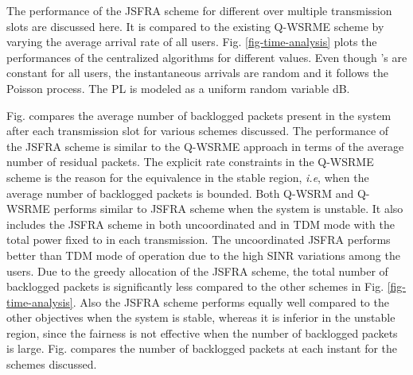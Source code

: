 The performance of the \ac{JSFRA} scheme for different  over multiple transmission slots are discussed here. It is compared to the existing \ac{Q-WSRME} scheme by varying the average arrival rate  of all users. Fig. \ref{fig-time-analysis} plots the performances of the centralized algorithms for different  values. Even though 's are constant for all users, the instantaneous arrivals are random and it follows the Poisson process. The \ac{PL} is modeled as a uniform random variable \me{[0,-6]} dB.

Fig.  compares the average number of backlogged packets present in the system after each transmission slot for various schemes discussed. The performance of the  \ac{JSFRA} scheme is similar to the \ac{Q-WSRME} approach in terms of the average number of residual packets. The explicit rate constraints in the \ac{Q-WSRME} scheme is the reason for the equivalence in the stable region, \textit{i.e}, when the average number of backlogged packets is bounded. Both \ac{Q-WSRM} and \ac{Q-WSRME} performs similar to  \ac{JSFRA} scheme when the system is unstable. It also includes the  \ac{JSFRA} scheme in both uncoordinated and in \ac{TDM} mode with the total power fixed to  in each transmission. The uncoordinated \ac{JSFRA} performs better than \ac{TDM} mode of operation due to the high \ac{SINR} variations among the users. Due to the greedy allocation of the  \ac{JSFRA} scheme, the total number of backlogged packets is significantly less compared to the other schemes in Fig. \ref{fig-time-analysis}. Also the \me{\ell_{\infty}} \ac{JSFRA} scheme performs equally well compared to the other objectives when the system is stable, whereas it is inferior in the unstable region, since the fairness is not effective when the number of backlogged packets is large. Fig.  compares the number of backlogged packets at each instant for the schemes discussed.

